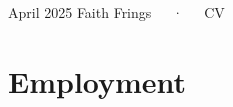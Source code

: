 \documentclass[11pt,a4paper,]{awesome-cv}
\begin{document}
\makecvheader

\makecvfooter
  {April 2025}
    {Faith Frings~~~·~~~CV}
  {\thepage}





\section{Employment}\label{employment}
\end{document}
